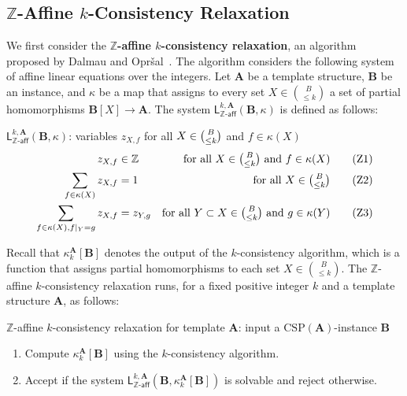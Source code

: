 \documentclass[a4paper,english, thm-restate]{lipics-v2021}
\newcommand{\ZZ}{\mathbb{Z}}
\newcommand{\defining}[1]{\textbf{#1}}
\newcommand{\StructA}{\mathbf{A}}
\newcommand{\StructB}{\mathbf{B}}
\newcommand{\CSP}[1]{\mathrm{CSP}(#1)}
\newcommand{\kcol}[3]{\kappa_{#1}^{#2}[#3]}
\newcommand{\restrict}[2]{#1|_{#2}}
\newcommand{\leqs}{\mathsf{L}}
\newcommand{\zafkleq}[4]{\leqs^{#1,#2}_{\ZZ\mathsf{\text{-}aff}}(#3,#4)}
\begin{document}
	
	\subsection{\texorpdfstring{$\ZZ$}{ℤ}-Affine \texorpdfstring{$k$}{k}-Consistency Relaxation}
	\label{app:zAffineConsistency}
	
	
	We first consider the \defining{$\ZZ$-affine $k$-consistency relaxation},
	an algorithm proposed by Dalmau and Opr\v{s}al~\cite{DalmauOprsal2024}.
	The algorithm considers the following system of affine linear equations over the integers.
	Let $\StructA$ be a template structure, $\StructB$ be an instance,
	and $\kappa$ be a map
	that assigns to every set  $X \in \binom{B}{\leq k}$ a set of partial homomorphisms $\StructB[X] \to \StructA$.
	The system $\zafkleq{k}{\StructA}{\StructB}{\kappa}$
	is defined as follows: 
	
	\begin{systembox}{$\zafkleq{k}{\StructA}{\StructB}{\kappa}$: variables $z_{X,f}$
			for all $X \in {\tbinom{B} {\leq k}}$
			and $f \in \kappa(X)$}
		\begin{align*}
			z_{X,f} &\in \ZZ &  \text{for all } X \in \tbinom{B}{\leq k} \text { and } f \in \kappa(X)\tag{Z1}\\
			\sum_{f \in \kappa(X)}  z_{X,f}&= 1 &  \text{for all } X \in \tbinom{B}{\leq k}\label{eqn:zaff-sum-to-one}\tag{Z2}\\
			\sum_{f \in \kappa(X), \restrict{f}{Y} = g} z_{X,f} &= z_{Y,g} & \text{for all } Y\subset X \in \tbinom{B}{\leq k} \text { and } g \in \kappa(Y) \label{eqn:zaff-agree}\tag{Z3}
		\end{align*}
	\end{systembox}
	
	\noindent Recall that $\kcol{k}{\StructA}{\StructB}$ denotes the output of the $k$-consistency algorithm,
	which is a function that  assigns partial homomorphisms to each set $X \in \binom{B}{\leq k}$.
	The $\ZZ$-affine $k$-consistency relaxation runs, for a fixed positive integer $k$ and a template structure $\StructA$, as follows:
	\begin{algobox}{$\ZZ$-affine $k$-consistency relaxation for template $\StructA$: input a $\CSP{\StructA}$-instance $\StructB$}
		\begin{enumerate}
			\item Compute $\kcol{k}{\StructA}{\StructB}$ using the $k$-consistency algorithm.
			\item Accept if the system $\zafkleq{k}{\StructA}{\StructB}{\kcol{k}{\StructA}{\StructB}}$ is solvable and reject otherwise.
		\end{enumerate}
	\end{algobox}
	
\end{document}
